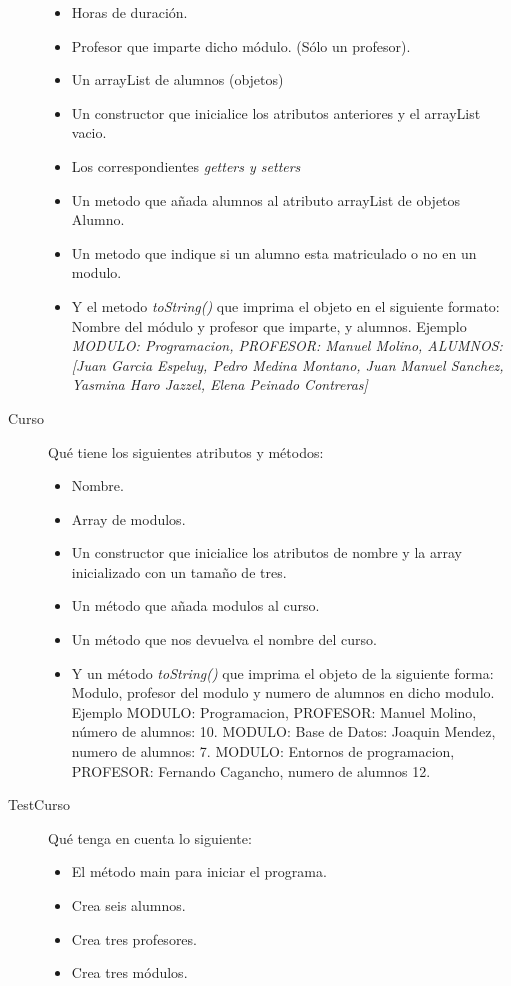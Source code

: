 \documentclass[addpoints,12pt]{exam}
\begin{document}
\begin{questions}
\begin{description}
\begin{itemize}
\item Horas de duración. 
\item Profesor que imparte dicho módulo. (Sólo un profesor).
\item Un arrayList de alumnos (objetos)
\item Un constructor que inicialice los atributos anteriores y el arrayList vacio.
\item Los correspondientes \emph{getters y setters}
\item Un metodo que añada alumnos al atributo arrayList de objetos Alumno.
\item Un metodo que indique si un alumno esta matriculado o no en un modulo.
\item Y el metodo \emph{toString()} que imprima el objeto en el siguiente formato: Nombre del módulo y profesor que imparte, y alumnos. Ejemplo \emph{MODULO: Programacion, PROFESOR: Manuel Molino, ALUMNOS: [Juan Garcia Espeluy, Pedro Medina Montano, Juan Manuel Sanchez, Yasmina Haro Jazzel, Elena Peinado Contreras]}
\end{itemize}
\item[Curso] Qué tiene los siguientes atributos y métodos:
\begin{itemize}
\item Nombre.
\item Array de modulos.
\item Un constructor que inicialice los atributos de nombre y la array inicializado con un tamaño de tres.
\item Un método que añada modulos al curso.
\item Un método que nos devuelva el nombre del curso.
\item Y un método \emph{toString()} que imprima el objeto de la siguiente forma: Modulo, profesor del modulo y numero de alumnos en dicho modulo. Ejemplo MODULO: Programacion, PROFESOR: Manuel Molino, número de alumnos: 10. MODULO: Base de Datos: Joaquin Mendez, numero de alumnos: 7. MODULO: Entornos de programacion, PROFESOR: Fernando Cagancho, numero de alumnos 12. 
\end{itemize}
\item[TestCurso] Qué tenga en cuenta lo siguiente:
\begin{itemize}
\item El método main para iniciar el programa.
\item Crea seis alumnos.
\item Crea tres profesores.
\item Crea tres módulos.

\end{itemize}
\end{description}
\end{questions}
\end{document}
